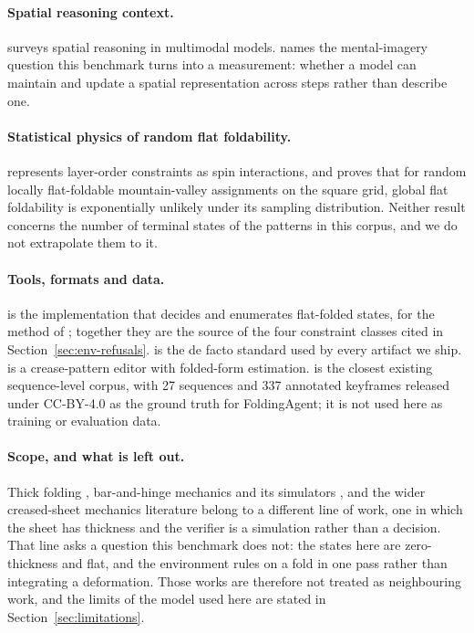 \paragraph{Spatial reasoning context.}
\citet{spatial-survey} surveys spatial reasoning in multimodal models. \citet{vot} names the
mental-imagery question this benchmark turns into a measurement: whether a model can maintain and
update a spatial representation across steps rather than describe one.

\paragraph{Statistical physics of random flat foldability.}
\citet{spin-model} represents layer-order constraints as spin interactions, and
\citet{random-locally} proves that for random locally flat-foldable mountain-valley assignments on
the square grid, global flat foldability is exponentially unlikely under its sampling
distribution. Neither result concerns the number of terminal states of the patterns in this
corpus, and we do not extrapolate them to it.

\paragraph{Tools, formats and data.}
\citet{flatfolder} is the implementation that decides and enumerates flat-folded states, for the
method of \citet{akitaya-flatfolder}; together they are the source of the four constraint classes
cited in Section~\ref{sec:env-refusals}. \citet{fold-format} is the de facto standard used by
every artifact we ship. \citet{oripa} is a crease-pattern editor with folded-form estimation.
\citet{purelandfold} is the closest existing sequence-level corpus, with 27 sequences and 337
annotated keyframes released under CC-BY-4.0 as the ground truth for FoldingAgent; it is not used
here as training or evaluation data.

\paragraph{Scope, and what is left out.}
Thick folding \citep{thick-folding}, bar-and-hinge mechanics \citep{bar-and-hinge} and its
simulators \citep{swomps,simfast}, and the wider creased-sheet mechanics literature belong
to a different line of work, one in which the sheet has thickness and the verifier is a simulation
rather than a decision. That line asks a question this benchmark does not: the states here are
zero-thickness and flat, and the environment rules on a fold in one pass rather than integrating a
deformation. Those works are therefore not treated as neighbouring work, and the limits of the
model used here are stated in Section~\ref{sec:limitations}.
